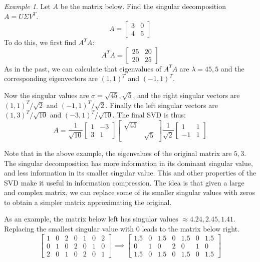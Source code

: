 \documentclass[11pt,oneside]{amsbook}
\theoremstyle{definition}
\theoremstyle{plain}
\theoremstyle{definition}
\theoremstyle{remark}
\newtheorem{example}[theorem]{Example}
\numberwithin{equation}{section}
\numberwithin{figure}{section}
\begin{document}
\begin{example}
  Let $A$ be the matrix below. Find the singular decomposition $A=U\Sigma V^T$.
  \[A=\begin{bmatrix}3&0\\4&5\end{bmatrix}
  \]
  To do this, we first find $A^TA$:
  \[A^TA=\begin{bmatrix}25&20\\20&25\end{bmatrix}
  \]
  As in the past, we can calculate that eigenvalues of $A^TA$ are $\lambda=45,5$ and the corresponding eigenvectors are $(1,1)^T$ and $(-1,1)^T$.
  
  Now the singular values are $\sigma=\sqrt{45},\sqrt{5}$, and the right singular vectors are $(1,1)^T/\sqrt{2}$ and $(-1,1)^T/\sqrt{2}$. Finally the left singular vectors are $(1,3)^T/\sqrt{10}$ and $(-3,1)^T/\sqrt{10}$. The final SVD is thus:
  \[A=\frac{1}{\sqrt{10}}\begin{bmatrix}1&-3\\3&1\end{bmatrix}
  \begin{bmatrix}\sqrt{45}\\&\sqrt{5}\end{bmatrix}
  \frac{1}{\sqrt{2}}\begin{bmatrix}1&1\\-1&1\end{bmatrix}
  \]
\end{example}

Note that in the above example, the eigenvalues of the original matrix are $5,3$. The singular decomposition has more information in its dominant singular value, and less information in its smaller singular value. This and other properties of the SVD make it useful in information compression. The idea is that given a large and complex matrix, we can replace some of its smaller singular values with zeros to obtain a simpler matrix approximating the original.

As an example, the matrix below left has singular values $\approx4.24,2.45,1.41$. Replacing the smallest singular value with $0$ leads to the matrix below right.
\[
\begin{bmatrix}
  1&0&2&0&1&0&2\\
  0&1&0&2&0&1&0\\
  2&0&1&0&2&0&1
\end{bmatrix}
\implies
\begin{bmatrix}
  1.5&0&1.5&0&1.5&0&1.5\\
  0&1&0&2&0&1&0\\
  1.5&0&1.5&0&1.5&0&1.5
\end{bmatrix}
\]
\end{document}
